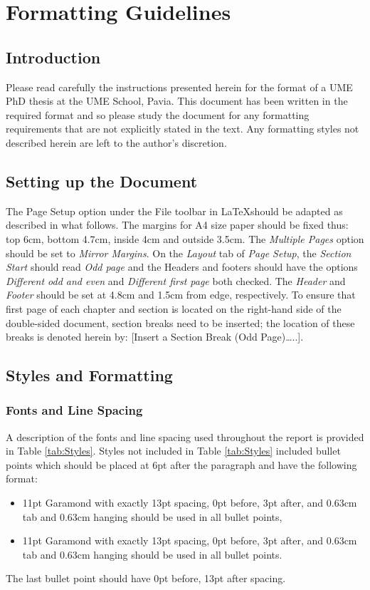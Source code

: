 \chapter{Formatting Guidelines}
\section{Introduction}
Please read carefully the instructions presented herein for the format of a UME PhD thesis at the UME School, Pavia. This document has been written in the required format and so please study the document for any formatting requirements that are not explicitly stated in the text. Any formatting styles not described herein are left to the author’s discretion. 
\section{Setting up the Document}
The Page Setup option under the File toolbar in \LaTeX \space should be adapted as described in what follows. The margins for A4 size paper should be fixed thus: top 6cm, bottom 4.7cm, inside 4cm and outside 3.5cm. The \textit{Multiple Pages} option should be set to \textit{Mirror Margins}. On the \textit{Layout} tab of \textit{Page Setup}, the \textit{Section Start} should read \textit{Odd page} and the Headers and footers should have the options \textit{Different odd and even} and \textit{Different first page} both checked. The \textit{Header} and \textit{Footer} should be set at 4.8cm and 1.5cm from edge, respectively. To ensure that first page of each chapter and section is located on the right-hand side of the double-sided document, section breaks need to be inserted; the location of these breaks is denoted herein by: [Insert a Section Break (Odd Page)…..]. 
\section{Styles and Formatting}
\subsection{Fonts and Line Spacing}
A description of the fonts and line spacing used throughout the report is provided in Table \ref{tab:Styles}. Styles not included in Table \ref{tab:Styles} included bullet points which should be placed at 6pt after the paragraph and have the following format:
\begin{itemize}
    \item {}11pt Garamond with exactly 13pt spacing, 0pt before, 3pt after, and 0.63cm tab and 0.63cm hanging should be used in all bullet points,
    \item 11pt Garamond with exactly 13pt spacing, 0pt before, 3pt after, and 0.63cm tab and 0.63cm hanging should be used in all bullet points.
\end{itemize}
The last bullet point should have 0pt before, 13pt after spacing.

